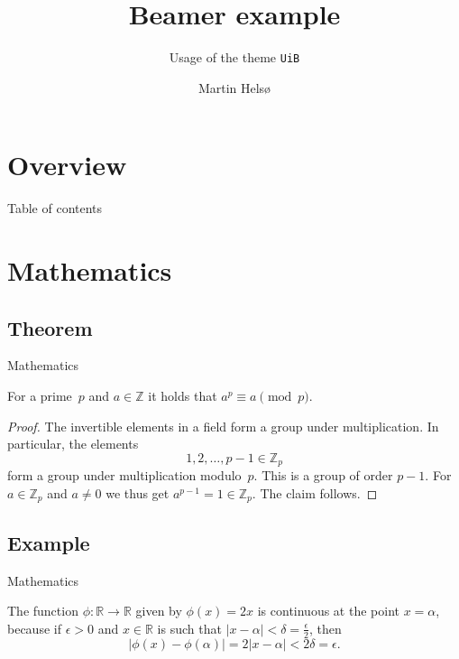 \documentclass[UKenglish]{beamer}
\author{Martin Helsø}
\title{Beamer example}
\subtitle{Usage of the theme \texttt{UiB}}
\begin{document}
\section{Overview}
%
%
\begin{frame}{Table of contents}
    \tableofcontents[currentsection]
\end{frame}


\section{Mathematics}
\subsection{Theorem}


\begin{frame}{Mathematics}
    \begin{theorem}
        For a prime~\(p\) and \(a \in \mathbb{Z}\) it holds that \(a^p \equiv a \pmod{p}\).
    \end{theorem}

    \begin{proof}
        The invertible elements in a field form a group under multiplication.
        In particular, the elements
        \begin{equation*}
            1, 2, \ldots, p - 1 \in \mathbb{Z}_p
        \end{equation*}
        form a group under multiplication modulo~\(p\).
        This is a group of order \(p - 1\).
        For \(a \in \mathbb{Z}_p\) and \(a \neq 0\) we thus get \(a^{p-1} = 1 \in \mathbb{Z}_p\).
        The claim follows.
    \end{proof}
\end{frame}


\subsection{Example}


\begin{frame}{Mathematics}
    \begin{example}
        The function \(\phi \colon \mathbb{R} \to \mathbb{R}\) given by \(\phi(x) = 2x\) is continuous at the point \(x = \alpha\),
        because if \(\epsilon > 0\) and \(x \in \mathbb{R}\) is such that \(\lvert x - \alpha \rvert < \delta = \frac{\epsilon}{2}\),
        then
        \begin{equation*}
            \lvert \phi(x) - \phi(\alpha)\rvert = 2\lvert x - \alpha \rvert < 2\delta = \epsilon.
        \end{equation*}
    \end{example}
\end{frame}
\end{document}
